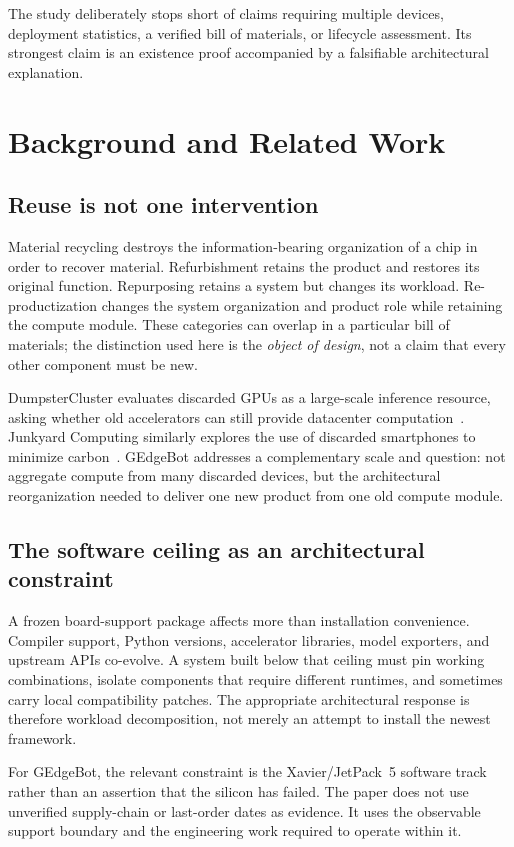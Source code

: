 \documentclass[conference]{IEEEtran}
\begin{document}
The study deliberately stops short of claims requiring multiple devices, deployment statistics, a verified bill of materials, or lifecycle assessment. Its strongest claim is an existence proof accompanied by a falsifiable architectural explanation.

\section{Background and Related Work}
\subsection{Reuse is not one intervention}
Material recycling destroys the information-bearing organization of a chip in order to recover material. Refurbishment retains the product and restores its original function. Repurposing retains a system but changes its workload. Re-productization changes the system organization and product role while retaining the compute module. These categories can overlap in a particular bill of materials; the distinction used here is the \emph{object of design}, not a claim that every other component must be new.

DumpsterCluster evaluates discarded GPUs as a large-scale inference resource, asking whether old accelerators can still provide datacenter computation~\cite{dumpstercluster_2026}. Junkyard Computing similarly explores the use of discarded smartphones to minimize carbon~\cite{junkyard_computing}. GEdgeBot addresses a complementary scale and question: not aggregate compute from many discarded devices, but the architectural reorganization needed to deliver one new product from one old compute module.

\subsection{The software ceiling as an architectural constraint}
A frozen board-support package affects more than installation convenience. Compiler support, Python versions, accelerator libraries, model exporters, and upstream APIs co-evolve. A system built below that ceiling must pin working combinations, isolate components that require different runtimes, and sometimes carry local compatibility patches. The appropriate architectural response is therefore workload decomposition, not merely an attempt to install the newest framework.

For GEdgeBot, the relevant constraint is the Xavier/JetPack~5 software track rather than an assertion that the silicon has failed. The paper does not use unverified supply-chain or last-order dates as evidence. It uses the observable support boundary and the engineering work required to operate within it.
\end{document}
